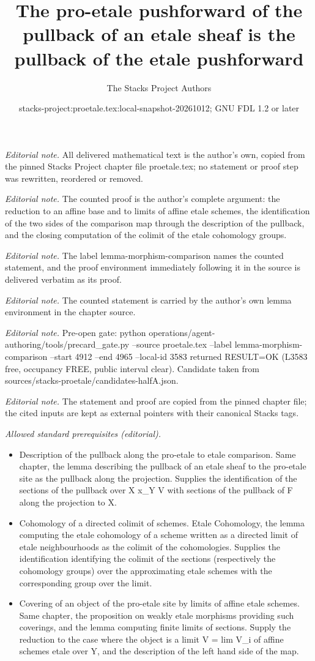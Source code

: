 \documentclass[10pt,a4paper]{amsart}
\title{The pro-etale pushforward of the pullback of an etale sheaf is the pullback of the etale pushforward}
\author{The Stacks Project Authors}
\date{stacks-project:proetale.tex:local-snapshot-20261012; GNU FDL 1.2 or later}
\theoremstyle{plain}
\theoremstyle{definition}
\theoremstyle{remark}
\numberwithin{equation}{subsection}
\begin{document}
\maketitle
\noindent\textit{Editorial note.} All delivered mathematical text is the author's own, copied from the pinned Stacks Project chapter file proetale.tex; no statement or proof step was rewritten, reordered or removed.\par\medskip
\noindent\textit{Editorial note.} The counted proof is the author's complete argument: the reduction to an affine base and to limits of affine etale schemes, the identification of the two sides of the comparison map through the description of the pullback, and the closing computation of the colimit of the etale cohomology groups.\par\medskip
\noindent\textit{Editorial note.} The label lemma-morphism-comparison names the counted statement, and the proof environment immediately following it in the source is delivered verbatim as its proof.\par\medskip
\noindent\textit{Editorial note.} The counted statement is carried by the author's own lemma environment in the chapter source.\par\medskip
\noindent\textit{Editorial note.} Pre-open gate: python operations/agent-authoring/tools/precard\_gate.py --source proetale.tex --label lemma-morphism-comparison --start 4912 --end 4965 --local-id 3583 returned RESULT=OK (L3583 free, occupancy FREE, public interval clear). Candidate taken from sources/stacks-proetale/candidates-halfA.json.\par\medskip
\noindent\textit{Editorial note.} The statement and proof are copied from the pinned chapter file; the cited inputs are kept as external pointers with their canonical Stacks tags.\par\medskip
\noindent\textit{Allowed standard prerequisites (editorial).}\begin{itemize}
\item Description of the pullback along the pro-etale to etale comparison. Same chapter, the lemma describing the pullback of an etale sheaf to the pro-etale site as the pullback along the projection. Supplies the identification of the sections of the pullback over X x\_Y V with sections of the pullback of F along the projection to X.
\item Cohomology of a directed colimit of schemes. Etale Cohomology, the lemma computing the etale cohomology of a scheme written as a directed limit of etale neighbourhoods as the colimit of the cohomologies. Supplies the identification identifying the colimit of the sections (respectively the cohomology groups) over the approximating etale schemes with the corresponding group over the limit.
\item Covering of an object of the pro-etale site by limits of affine etale schemes. Same chapter, the proposition on weakly etale morphisms providing such coverings, and the lemma computing finite limits of sections. Supply the reduction to the case where the object is a limit V = lim V\_i of affine schemes etale over Y, and the description of the left hand side of the map.
\end{itemize}\medskip
\end{document}

